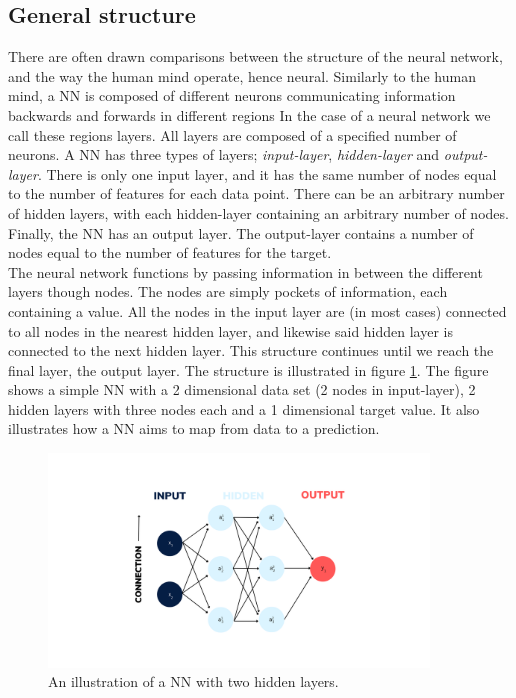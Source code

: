 \subsection{General structure}
There are often drawn comparisons between the structure of the neural network, 
and the way the human mind operate, hence neural. Similarly to the human mind, a \ac{NN} is 
composed of different neurons communicating information backwards and forwards in different 
regions In the case of a neural network we call these regions layers. All layers
are composed of a specified number of neurons. A \ac{NN} has three types of layers;
\emph{input-layer}, \emph{hidden-layer} and \emph{output-layer}. There is only one input layer, and it has
the same number of nodes equal to the number of features for each data point. 
There can be an arbitrary number of hidden layers, with each hidden-layer containing
an arbitrary number of nodes. Finally, the \ac{NN} has an output layer. The output-layer
contains a number of nodes equal to the number of features for the target.
\\
The neural network functions by passing information in between the different layers though 
nodes. The nodes are simply pockets of information, each containing a value. 
All the nodes in the input layer are (in most cases) connected to all nodes in the nearest hidden layer,
and likewise said hidden layer is connected to the next hidden layer. This structure continues
until we reach the final layer, the output layer. The structure is illustrated in figure
\ref{fig:NN}. The figure shows a simple \ac{NN} with a 2 dimensional data set (2 nodes in input-layer),
2 hidden layers with three nodes each and a 1 dimensional target value. It also illustrates 
how a \ac{NN} aims to map from data to a prediction.
\begin{figure}
    \centering
    \vspace*{-12.5mm} 
    \includegraphics[width=0.9\textwidth]{Figures/Illustrations/Input_labels.png}
    \vspace*{-12.5mm} 
    \caption{An illustration of a \ac{NN} with two hidden layers.}
    \label{fig:NN}
\end{figure}
